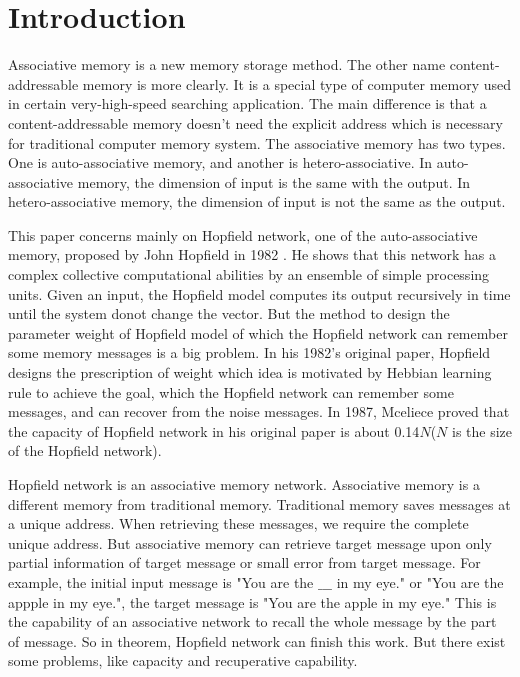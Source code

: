 
\section{Introduction}

Associative memory is a new memory storage method. 
The other name content-addressable memory is more clearly. 
It is a special type of computer memory used in certain very-high-speed searching application\cite{krikelis1994associative}.  
The main difference is that a content-addressable memory doesn't need the explicit address which is necessary for traditional computer memory system. 
The associative memory has two types. One is auto-associative memory, and another is hetero-associative. 
In auto-associative memory, the dimension of input is the same with the output. 
In hetero-associative memory, the dimension of input is not the same as the output.

This paper concerns mainly on Hopfield network, one of the auto-associative memory, proposed by John Hopfield in 1982 \cite{hopfield1982neural}. 
He shows that this  network has a complex collective computational  abilities by an ensemble of simple processing units. 
Given an input, the Hopfield model computes its output recursively in time until the system donot change the vector. 
But the  method to design the parameter weight of Hopfield model of which the Hopfield network can remember some memory messages is a big problem. 
In his 1982's original paper, Hopfield designs the prescription of weight which idea is motivated by Hebbian learning rule to achieve the goal, which the Hopfield network can remember some messages, and can recover from the noise messages. 
In 1987, Mceliece proved that the capacity of Hopfield network in his original paper is about 0.14$N$($N$ is the size of the Hopfield network)\cite{mceliece1987capacity}.

Hopfield network is an associative memory network. 
Associative memory is a different memory from traditional memory. 
Traditional memory saves messages at a unique address. When retrieving these messages, we require the complete unique address.
But associative memory can retrieve target message upon only partial information of target message or small error from target message. 
For example, the initial input message is "You are the $\_\_\_$ in my eye." or "You are the appple in my eye.", the target message is "You are the apple in my eye."
This is the capability of an associative network to recall the whole message by the part of message.
So in theorem, Hopfield network can finish this work. 
But there exist some problems, like capacity and recuperative capability.


